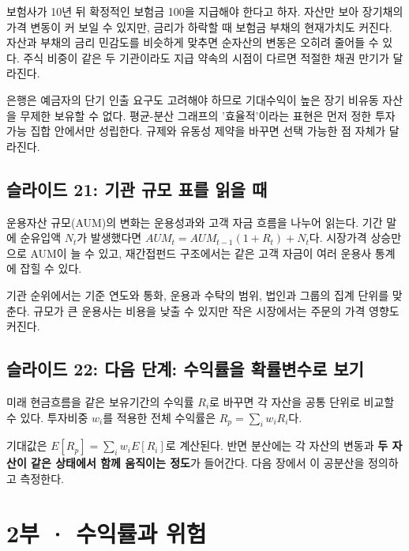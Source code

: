 \documentclass[11pt,a4paper]{article}
\begin{document}
보험사가 10년 뒤 확정적인 보험금 100을 지급해야 한다고 하자. 자산만 보아 장기채의 가격 변동이 커 보일 수 있지만, 금리가 하락할 때 보험금 부채의 현재가치도 커진다. 자산과 부채의 금리 민감도를 비슷하게 맞추면 순자산의 변동은 오히려 줄어들 수 있다. 주식 비중이 같은 두 기관이라도 지급 약속의 시점이 다르면 적절한 채권 만기가 달라진다.
\par

은행은 예금자의 단기 인출 요구도 고려해야 하므로 기대수익이 높은 장기 비유동 자산을 무제한 보유할 수 없다. 평균-분산 그래프의 '효율적'이라는 표현은 먼저 정한 투자 가능 집합 안에서만 성립한다. 규제와 유동성 제약을 바꾸면 선택 가능한 점 자체가 달라진다.
\par

\subsection{슬라이드 21: 기관 규모 표를 읽을 때}

운용자산 규모(AUM)의 변화는 운용성과와 고객 자금 흐름을 나누어 읽는다. 기간 말에 순유입액 $N_t$가 발생했다면 $AUM_t=AUM_{t-1}(1+R_t)+N_t$다. 시장가격 상승만으로 AUM이 늘 수 있고, 재간접펀드 구조에서는 같은 고객 자금이 여러 운용사 통계에 잡힐 수 있다.
\par

기관 순위에서는 기준 연도와 통화, 운용과 수탁의 범위, 법인과 그룹의 집계 단위를 맞춘다. 규모가 큰 운용사는 비용을 낮출 수 있지만 작은 시장에서는 주문의 가격 영향도 커진다.
\par

\subsection{슬라이드 22: 다음 단계: 수익률을 확률변수로 보기}

미래 현금흐름을 같은 보유기간의 수익률 $R_i$로 바꾸면 각 자산을 공통 단위로 비교할 수 있다. 투자비중 $w_i$를 적용한 전체 수익률은 $R_p=\sum_i w_iR_i$다.
\par

기대값은 $E[R_p]=\sum_iw_iE[R_i]$로 계산된다. 반면 분산에는 각 자산의 변동과 \textbf{두 자산이 같은 상태에서 함께 움직이는 정도}가 들어간다. 다음 장에서 이 공분산을 정의하고 측정한다.
\par

\clearpage

\section{2부 · 수익률과 위험}
\end{document}
